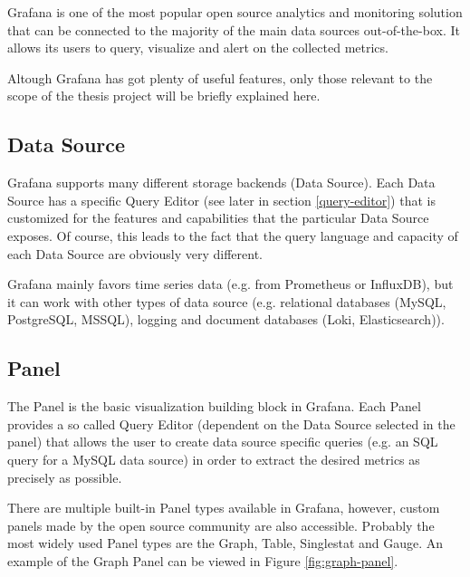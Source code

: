 Grafana is one of the most popular open source analytics and monitoring solution that can be connected to the majority of the main data sources out-of-the-box. It allows its users to query, visualize and alert on the collected metrics. 

Altough Grafana has got plenty of useful features, only those relevant to the scope of the thesis project will be briefly explained here.


\subsection{Data Source}

Grafana supports many different storage backends (Data Source). Each Data Source has a specific Query Editor (see later in section \ref*{query-editor}) that is customized for the features and capabilities that the particular Data Source exposes. Of course, this leads to the fact that the query language and capacity of each Data Source are obviously very different. \cite{grafana-datasource}

Grafana mainly favors time series data (e.g. from Prometheus or InfluxDB), but it can work with other types of data source (e.g. relational databases (MySQL, PostgreSQL, MSSQL), logging and document databases (Loki, Elasticsearch)).

\subsection{Panel}

The Panel is the basic visualization building block in Grafana. Each Panel provides a so called Query Editor (dependent on the Data Source selected in the panel) that allows the user to create data source specific queries (e.g. an SQL query for a MySQL data source) in order to extract the desired metrics as precisely as possible. \cite{grafana-panel}

There are multiple built-in Panel types available in Grafana, however, custom panels made by the open source community are also accessible. Probably the most widely used Panel types are the Graph, Table, Singlestat and Gauge. An example of the Graph Panel can be viewed in Figure \ref{fig:graph-panel}.

